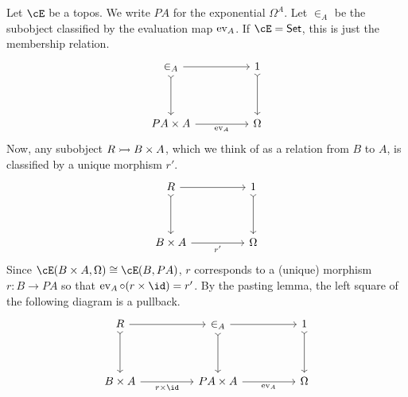 \documentclass[article,10pt,oneside]{memoir}
\begin{document}
Let $\cE$ be a topos.
We write $PA$ for the exponential $\Omega^{A}$.
Let $\in_{A}$ be the subobject classified by the evaluation map $\operatorname{ev}_{A}$.
If $\cE = \CSet$, this is just the membership relation.
\[\begin{tikzcd}
    {\in_{A}} && 1 \\
    \\
    {PA \times A} && \Omega
    \arrow[tail, from=1-3, to=3-3]
    \arrow["{\ev_{A}}"', from=3-1, to=3-3]
    \arrow[tail, from=1-1, to=3-1]
    \arrow[from=1-1, to=1-3]
  \end{tikzcd}\]
Now, any subobject $R \rightarrowtail B \times A$, which we think of as a relation from $B$ to $A$, is classified by a unique morphism $r'$.
\[\begin{tikzcd}
    R && 1 \\
    \\
    {B \times A} && \Omega
    \arrow[tail, from=1-3, to=3-3]
    \arrow["{r'}"', from=3-1, to=3-3]
    \arrow[tail, from=1-1, to=3-1]
    \arrow[from=1-1, to=1-3]
  \end{tikzcd}\]
Since $\cE(B \times A, \Omega) \iso \cE(B, PA)$, $r$ corresponds to a (unique) morphism $r : B \to PA$ so that $\ev_{A} \circ (r \times \id) = r'$.
By the pasting lemma, the left square of the following diagram is a pullback.
\[\begin{tikzcd}
    R && {\in_{A}} && 1 \\
    \\
    {B \times A} && {PA \times A} && \Omega
    \arrow[tail, from=1-5, to=3-5]
    \arrow["{\ev_{A}}"', from=3-3, to=3-5]
    \arrow[tail, from=1-3, to=3-3]
    \arrow[from=1-3, to=1-5]
    \arrow["{r \times \id}"', from=3-1, to=3-3]
    \arrow[tail, from=1-1, to=3-1]
    \arrow[from=1-1, to=1-3]
  \end{tikzcd}\]
\end{document}
